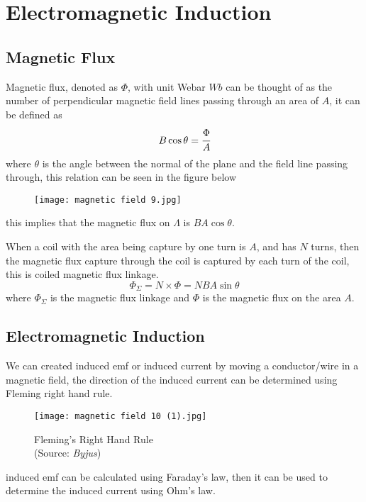 \documentclass{article}
\begin{document}



\newpage
\section{Electromagnetic Induction}

 \subsection{Magnetic Flux}


Magnetic flux, denoted as $\Phi$, with unit Webar $Wb$ can be thought of as the number of perpendicular magnetic field lines passing through an area of $A$, it can be defined as 
$$B\cos \theta=\cfrac{\Phi}{A}$$
where $\theta$ is the angle between the normal of the plane and the field line passing through, this relation can be seen in the figure below 
\begin{figure}[H]
    \centering
    \texttt{[image: magnetic field 9.jpg]}
\end{figure}
this implies that the magnetic flux on $\Lambda$ is $BA\cos \theta$.

When a coil with the area being capture by one turn is $A$, and has $N$ turns, then the magnetic flux capture through the coil is captured by each turn of the coil, this is coiled magnetic flux linkage. 
$$\Phi_{\Sigma}=N\times \Phi=NBA\sin\theta$$
where $\Phi_{\Sigma}$ is the magnetic flux linkage and $\Phi$ is the magnetic flux on the area $A$.


 \subsection{Electromagnetic Induction}


We can created induced emf or induced current by moving a conductor/wire in a magnetic field, the direction of the induced current can be determined using Fleming right hand rule.
\begin{figure}[H]
    \centering
    \captionsetup{justification=centering,margin=2cm}
    \texttt{[image: magnetic field 10 (1).jpg]}
    \caption*{Fleming's Right Hand Rule \\ (Source: \textit{Byjus})}
\end{figure}
induced emf can be calculated using Faraday's law, then it can be used to determine
the induced current using Ohm's law.
\newpage
\end{document}
